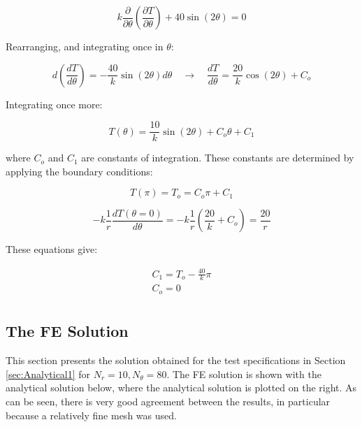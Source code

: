 \documentclass[10pt]{article}
\begin{document}
\begin{equation}
k\frac{\partial}{\partial\theta}\left(\frac{\partial T}{\partial\theta}\right)+40\sin{(2\theta)}=0
\end{equation}

Rearranging, and integrating once in \(\theta\):

\begin{equation}
d\left(\frac{d T}{d\theta}\right)=-\frac{40}{k}\sin{(2\theta)}d\theta\quad\rightarrow\quad \frac{dT}{d\theta}=\frac{20}{k}\cos{(2\theta)}+C_o
\end{equation}

Integrating once more:

\begin{equation}
T(\theta)=\frac{10}{k}\sin{(2\theta)}+C_o\theta+C_1
\end{equation}

where \(C_o\) and \(C_1\) are constants of integration. These constants are determined by applying the boundary conditions:

\begin{equation}
T(\pi)=T_o=C_o\pi+C_1
\end{equation}

\begin{equation}
-k\frac{1}{r}\frac{dT(\theta=0)}{d\theta}=-k\frac{1}{r}\left(\frac{20}{k}+C_o\right)=\frac{20}{r}
\end{equation}

These equations give:

\begin{equation}
\begin{aligned}
C_1=T_o-\frac{40}{k}\pi\\
C_o=0\\
\end{aligned}
\end{equation}

\subsection{The FE Solution}

This section presents the solution obtained for the test specifications in Section \ref{sec:Analytical1} for \(N_r=10, N_\theta=80\). The FE solution is shown with the analytical solution below, where the analytical solution is plotted on the right. As can be seen, there is very good agreement between the results, in particular because a relatively fine mesh was used.
\end{document}
